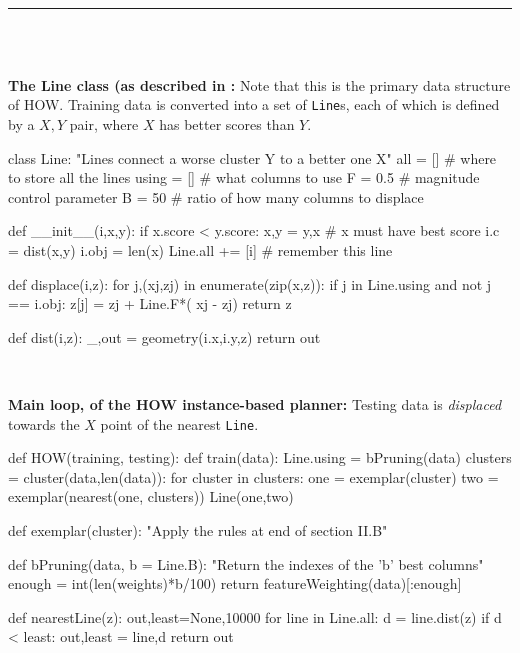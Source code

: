 

\begin{figure*} 
~\hrule~
\begin{minipage}{.45\linewidth}
\small

~\\

{\bf The Line class (as described in :}
Note that this is the primary data structure of HOW.
Training data is converted into a set of {\tt Line}s,
each of which is defined by a $X,Y$ pair, where $X$
has better scores than $Y$.
 
\begin{python}[left]
class Line:
  "Lines connect a worse cluster Y to a better one X"
  all   = []    # where to store all the lines
  using = []    # what columns to use
  F     = 0.5   # magnitude control parameter
  B     = 50    # ratio of how many columns to displace

 def __init__(i,x,y):
    if x.score < y.score:
      x,y = y,x      # x must have best score
    i.c = dist(x,y) 
    i.obj = len(x) 
    Line.all += [i]  # remember this line


  def displace(i,z):
    for j,(xj,zj) in enumerate(zip(x,z)):
      if j in Line.using and not j == i.obj:  
        z[j] = zj + Line.F*( xj - zj)
    return z

  def dist(i,z):
    _,out = geometry(i.x,i.y,z)
    return out
\end{python}

~~



{\bf Main loop, of the  HOW  instance-based planner:}
Testing data is {\em displaced}
towards   the $X$ point of the nearest {\tt Line}.
\begin{python}[left]
def HOW(training, testing):
  def train(data):
    Line.using = bPruning(data)
    clusters   = cluster(data,len(data)):
    for cluster in clusters:
      one = exemplar(cluster)
      two = exemplar(nearest(one, clusters))
      Line(one,two)
 
   def exemplar(cluster):
    "Apply the rules at end of section II.B"

     
   def bPruning(data,  b = Line.B):
    "Return the indexes of the 'b' best columns" 
    enough  = int(len(weights)*b/100)
    return featureWeighting(data)[:enough]

  def nearestLine(z):
    out,least=None,10000
    for line in Line.all:
      d = line.dist(z)
      if d < least: out,least = line,d
    return out
   

\end{python}
\end{minipage}
\end{figure*}
